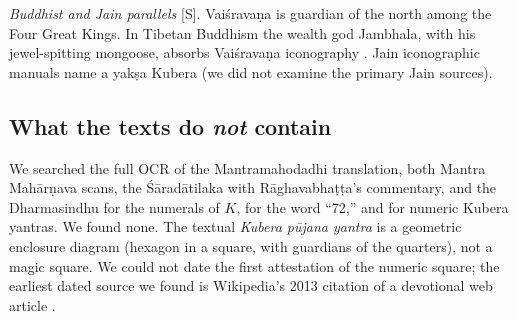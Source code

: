 \documentclass[journal]{IEEEtran}
\theoremstyle{definition}
\newcommand{\Schol}{\textsf{[S]}}
\begin{document}
\emph{Buddhist and Jain parallels} \Schol. Vai\'srava\d na is guardian of the north among the Four Great Kings. In Tibetan Buddhism the wealth god Jambhala, with his jewel-spitting mongoose, absorbs Vai\'srava\d na iconography \cite{getty1914,sutherland1991}. Jain iconographic manuals name a yak\d sa Kubera (we did not examine the primary Jain sources).

\subsection{What the texts do \emph{not} contain}
We searched the full OCR of the Mantramahodadhi translation, both Mantra Mah\=ar\d nava scans, the \'S\=arad\=atilaka with R\=aghavabha\d t\d ta's commentary, and the Dharmasindhu for the numerals of $K$, for the word ``72,'' and for numeric Kubera yantras. We found none. The textual \emph{Kubera p\=ujana yantra} is a geometric enclosure diagram (hexagon in a square, with guardians of the quarters), not a magic square. We could not date the first attestation of the numeric square; the earliest dated source we found is Wikipedia's 2013 citation of a devotional web article \cite{wiki_kuberakolam}.
\end{document}
